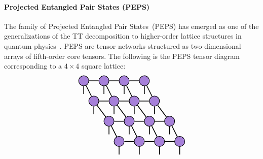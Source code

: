 \paragraph{Projected Entangled Pair States (PEPS)}
The family of Projected Entangled Pair States~(PEPS) has emerged as one of the generalizations of the TT decomposition to higher-order lattice structures in quantum physics~\citep{verstraete2004renormalization,orus2014practical}.
PEPS are tensor networks structured as two-dimensional arrays of fifth-order core tensors. The following is the PEPS tensor diagram  corresponding to a $4\times 4$ square lattice:
$$
\begin{tikzpicture}[baseline=-0.5ex]
    \tikzset{tensor/.style = {minimum size = 0.5cm,shape = circle,thick,draw=black,inner sep = 0pt}, edge/.style = {thick,line width=.4mm},every loop/.style={}}
    \def\x{6}
    \def\y{0}
     \node[tensor,fill=red!30!blue!50!white] (A) at (\x,\y) {};
     \node[tensor,fill=red!30!blue!50!white] (B) at (\x+1,\y) {};
     \node[tensor,fill=red!30!blue!50!white] (C) at (\x+2,\y) {};
     \node[tensor,fill=red!30!blue!50!white] (D) at (\x+0.5,\y-1) {};
     \node[tensor,fill=red!30!blue!50!white] (E) at (\x+1.5,\y-1) {};
     \node[tensor,fill=red!30!blue!50!white] (F) at (\x+2.5,\y-1) {};
     \node[tensor,fill=red!30!blue!50!white] (G) at (\x+1.25,\y-2) {};
     \node[tensor,fill=red!30!blue!50!white] (H) at (\x+2.25,\y-2) {};
    \node[tensor,fill=red!30!blue!50!white] (I) at (\x+3.25,\y-2) {};
     \node[tensor,fill=red!30!blue!50!white] (J) at (\x+3,\y) {};
     \node[tensor,fill=red!30!blue!50!white] (K) at (\x+3.5,\y-1) {};
     \node[tensor,fill=red!30!blue!50!white] (L) at (\x+4.25,\y-2) {};
     \node[tensor,fill=red!30!blue!50!white] (M) at (\x+1.75,\y-3) {};

     \node[tensor,fill=red!30!blue!50!white] (N) at (\x+2.75,\y-3) {};
     \node[tensor,fill=red!30!blue!50!white] (O) at (\x+3.75,\y-3) {};
     \node[tensor,fill=red!30!blue!50!white] (P) at (\x+4.75,\y-3) {};
     
     \draw[edge](A) --(B);
    \draw[edge](A) --(\x,\y-0.65);
    \draw[edge](A) --(D);
    \draw[edge](B) --(C);
    \draw[edge](B) --(\x+1,\y-0.65);
    \draw[edge](B) --(E);
    \draw[edge](D) --(E);
    \draw[edge](C) --(F);
    \draw[edge](C) -- (\x+2,\y-0.65);
    \draw[edge](E) --(F);
    \draw[edge](F) -- (\x+2.5,\y-1.65);
    \draw[edge](D) --(G);
    \draw[edge](D) -- (\x+0.5,\y-1.65);
    \draw[edge](G) --(H);
    \draw[edge](E) --(H);
    \draw[edge](E) -- (\x+1.5,\y-1.65);
    \draw[edge](H) --(I);
    \draw[edge](F) --(I);
    \draw[edge](G) -- (\x+1.25,\y-2.65);
    \draw[edge](H) -- (\x+2.25,\y-2.65);
    \draw[edge](I) -- (\x+3.25,\y-2.65);
    \draw[edge](C)--(J);
     \draw[edge](K)--(F);
    \draw[edge](I)--(L);
    \draw[edge](J)--(K);
    \draw[edge](K)--(L);
    \draw[edge](J) -- (\x+3,\y-0.65);
    \draw[edge](K) -- (\x+3.5,\y-1.65);
    \draw[edge](L) -- (\x+4.25,\y-2.65);
    \draw[edge](M)--(N);
    \draw[edge](N)--(O);
    \draw[edge](O)--(P);
    \draw[edge](G)--(M);
    \draw[edge](H)--(N);
    \draw[edge](I)--(O);
    \draw[edge](L)--(P);
    \draw[edge](M)--(\x+1.75,\y-3.65);
    \draw[edge](N)--(\x+2.75,\y-3.65);
    \draw[edge](O)--(\x+3.75,\y-3.65);
    \draw[edge](P)--(\x+4.75,\y-3.65);
\end{tikzpicture}
$$

